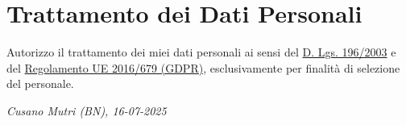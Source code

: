 \documentclass[a4paper,10pt]{article}
\begin{document}
\vspace{0.5em}
\hrulefill

\section*{\faUserShield \quad Trattamento dei Dati Personali}
Autorizzo il trattamento dei miei dati personali ai sensi del \href{https://www.garanteprivacy.it/}{D. Lgs. 196/2003} e del \href{https://eur-lex.europa.eu/legal-content/IT/TXT/?uri=CELEX%3A32016R0679}{Regolamento UE 2016/679 (GDPR)}, esclusivamente per finalità di selezione del personale.

\vspace{5mm}
\textit{Cusano Mutri (BN), 16-07-2025}
\end{document}
